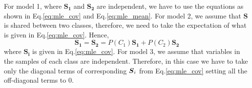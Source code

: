 For model 1,  where $\boldsymbol{S_1}$ and $\boldsymbol{S_2}$ are independent, we have to use the equations as shown in Eq.\ref{eq:mle_cov} and Eq.\ref{eq:mle_mean}.
For model 2, we assume that $\boldsymbol{S}$ is shared between two classes, therefore, we need to take the expectation of what is given in Eq.\ref{eq:mle_cov}. Hence,
\begin{equation*}
	\boldsymbol{S_1} = \boldsymbol{S_2} = P(C_1)\boldsymbol{S_1} + P(C_2)\boldsymbol{S_2}
\end{equation*}
where $\boldsymbol{S_i}$ is given in Eq.\ref{eq:mle_cov}.
\newline
For model 3, we assume that variables in the samples of each class are independent. Therefore, in this case we have to take only the diagonal terms of corresponding $\boldsymbol{S}_i$ from Eq.\ref{eq:mle_cov} setting all the off-diagonal terms to 0.

